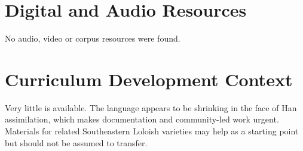 \documentclass[12pt]{article}
\begin{document}
\section{Digital and Audio Resources}
No audio, video or corpus resources were found.

\section{Curriculum Development Context}
Very little is available. The language appears to be shrinking in the face of Han assimilation, which makes documentation and community-led work urgent. Materials for related Southeastern Loloish varieties may help as a starting point but should not be assumed to transfer.
\end{document}
